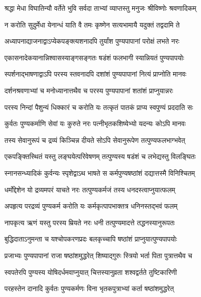 \twolineshloka
{श्रद्धा मेधा विघातिन्यौ वर्तेते भुवि सर्वदा}
{ताभ्यां व्याप्तस्तु मनुजः श्रीविष्णोः श्रवणादिकम्} %

\twolineshloka
{न करोति सुदुर्मेधा येनान्धं याति वै तमः}
{कृष्णेन सत्यभामायै यदुक्तं तद्वदामि ते} %

\twolineshloka
{अध्यापनाद्याजनाद्वाऽप्येकपङ्क्त्यशनादपि}
{तुर्यांश पुण्यपापानां परोक्षं लभते नरः} %

\twolineshloka
{एकासनादेकयानान्निश्वासस्याङ्गसङ्गतः}
{षडंशं फलभागी स्यान्नियतं पुण्यपापयोः} %

\twolineshloka
{स्पर्शनाद्भाषणाद्वाऽपि परस्य स्तवनादपि}
{दशांशं पुण्यपापानां नित्यं प्राप्नोति मानवः} %

\twolineshloka
{दर्शनश्रवणाभ्यां च मनोध्यानात्तथैव च}
{परस्य पुण्यपापानां शतांशं प्राप्नुयान्नरः} %

\twolineshloka
{परस्य निन्दां पैशुन्यं धिक्कारं च करोति यः}
{तत्कृतं पातकं प्राप्य स्वपुण्यं प्रददाति सः} %

\twolineshloka
{कुर्वतः पुण्यकर्माणि सेवां यः कुरुते नरः}
{पत्नीभृतकशिष्येभ्यो यदन्यः कोऽपि मानवः} %

\twolineshloka
{तस्य सेवानुरूपं च द्रव्यं किञ्चिन्न दीयते}
{सोऽपि सेवानुरूपेण तत्पुण्यफलभाग्भवेत्} %

\twolineshloka
{एकपङ्क्तिस्थितं यस्तु लङ्घयेत्परिवेषणम्}
{तत्पुण्यस्य षडंशं च लभेद्यस्तु विलङ्घितः} %

\twolineshloka
{स्नानसन्ध्यादिकं कुर्वन्यः स्पृशेद्वाऽथ भाषते}
{स कर्मपुण्यषष्ठांशं दद्यात्तस्मै विनिश्चितम्} %

\twolineshloka
{धर्मोद्देशेन यो द्रव्यमपरं याचते नरः}
{तत्पुण्यकर्मजं तस्य धनदस्त्वाप्नुयात्फलम्} %

\twolineshloka
{अपहृत्य परद्रव्यं पुण्यकर्म करोति यः}
{कर्मकृत्पापभाक्तत्र धनिनस्तद्भवं फलम्} %

\twolineshloka
{नापकृत्य ऋणं यस्तु परस्य म्रियते नरः}
{धनी तत्पुण्यमादत्ते तद्धनस्यानुरूपतः} %

\twolineshloka
{बुद्धिदाताऽनुमन्ता च यश्चोपकरणप्रदः}
{बलकृच्चापि षष्ठांशं प्राप्नुयात्पुण्यपापयोः} %

\twolineshloka
{प्रजाभ्यः पुण्यपापानां राजा षष्ठांशमुद्धरेत्}
{शिष्याद्गुरुः स्त्रियो भर्ता पिता पुत्रात्तथैव च} %

\twolineshloka
{स्वपतेरपि पुण्यस्य योषिदर्धमवाप्नुयात्}
{चित्तस्यानुव्रता शश्वद्वर्तते तुष्टिकारिणी} %

\twolineshloka
{परहस्तेन दानादि कुर्वतः पुण्यकर्मणः}
{विना भृतकपुत्राभ्यां कर्ता षष्ठांशमुद्धरेत्} %

